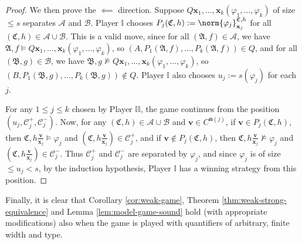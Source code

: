 \documentclass{article}
\theoremstyle{definition}
\begin{document}
\begin{proof}
    We then prove the $\impliedby$ direction. Suppose $Q\textbf{x}_1,\dots,\textbf{x}_k(\varphi_1,\dots,\varphi_k)$ of size $\leq s$ separates $\mathcal{A}$ and $\mathcal{B}$. Player $\mathbb{I}$ chooses $P_j(\mathfrak{C},h):=\norm{\varphi_j}_{\textbf{x}_j}^{\mathfrak{C},h}$ for all $(\mathfrak{C},h)\in\mathcal{A}\cup\mathcal{B}$. This is a valid move, since for all $(\mathfrak{A},f)\in\mathcal{A}$, we have $\mathfrak{A},f\models Q\textbf{x}_1,\dots,\textbf{x}_k(\varphi_1,\dots,\varphi_k)$, so $(A,P_1(\mathfrak{A},f),\dots,P_k(\mathfrak{A},f))\in Q$, and for all $(\mathfrak{B},g)\in\mathcal{B}$, we have $\mathfrak{B},g\not\models Q\textbf{x}_1,\dots,\textbf{x}_k(\varphi_1,\dots,\varphi_k)$, so $(B,P_1(\mathfrak{B},g),\dots,P_k(\mathfrak{B},g))\notin Q$. Player $\mathbb{I}$ also chooses $u_j:=s(\varphi_j)$ for each $j$.

    For any $1\leq j \leq k$ chosen by Player $\mathbb{II}$, the game continues from the position $(u_j,\mathcal{C}^+_j,\mathcal{C}^-_j)$. Now, for any $(\mathfrak{C},h)\in\mathcal{A}\cup\mathcal{B}$ and $\textbf{v}\in C^{\textbf{n}(j)}$, if $\textbf{v}\in P_j(\mathfrak{C},h)$, then $\mathfrak{C},h\frac{\textbf{v}}{\textbf{x}_j}\models \varphi_j$ and $(\mathfrak{C},h\frac{\textbf{v}}{\textbf{x}_j})\in \mathcal{C}^+_j$, and if $\textbf{v}\notin P_j(\mathfrak{C},h)$, then $\mathfrak{C},h\frac{\textbf{v}}{\textbf{x}_j}\not\models \varphi_j$ and $(\mathfrak{C},h\frac{\textbf{v}}{\textbf{x}_j})\in \mathcal{C}^-_j$. Thus $\mathcal{C}^+_j$ and $\mathcal{C}^-_j$ are separated by $\varphi_j$, and since $\varphi_j$ is of size $\leq u_j<s$, by the induction hypothesis, Player $\mathbb{I}$ has a winning strategy from this position.
\end{proof}

Finally, it is clear that Corollary \ref{cor:weak-game}, Theorem \ref{thm:weak-strong-equivalence} and Lemma \ref{lem:model-game-sound} hold (with appropriate modifications) also when the game is played with quantifiers of arbitrary, finite width and type.
\end{document}
